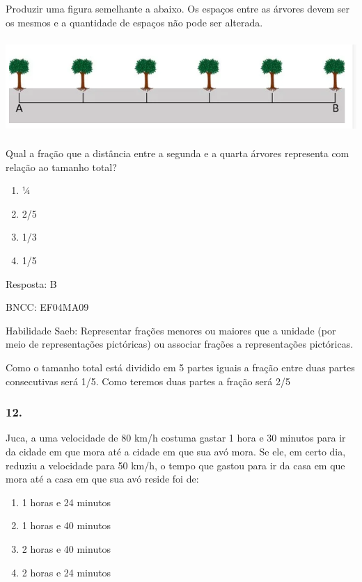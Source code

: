 Produzir uma figura semelhante a abaixo. Os espaços entre as árvores
devem ser os mesmos e a quantidade de espaços não pode ser alterada.

\includegraphics[width=5.90556in,height=1.41944in]{media/image147.png}

Qual a fração que a distância entre a segunda e a quarta árvores
representa com relação ao tamanho total?

\begin{enumerate}
\def\labelenumi{\alph{enumi})}
\item
  ¼
\item
  2/5
\item
  1/3
\item
  1/5
\end{enumerate}

Resposta: B

BNCC: EF04MA09

Habilidade Saeb: Representar frações menores ou maiores que a unidade
(por meio de representações pictóricas) ou associar frações a
representações pictóricas.

Como o tamanho total está dividido em 5 partes iguais a fração entre
duas partes consecutivas será 1/5. Como teremos duas partes a fração
será 2/5

\subsubsection{12.}\label{section-153}

Juca, a uma velocidade de 80 km/h costuma gastar 1 hora e 30 minutos
para ir da cidade em que mora até a cidade em que sua avó mora. Se ele,
em certo dia, reduziu a velocidade para 50 km/h, o tempo que gastou para
ir da casa em que mora até a casa em que sua avó reside foi de:

\begin{enumerate}
\def\labelenumi{\alph{enumi})}
\item
  1 horas e 24 minutos
\item
  1 horas e 40 minutos
\item
  2 horas e 40 minutos
\item
  2 horas e 24 minutos
\end{enumerate}

